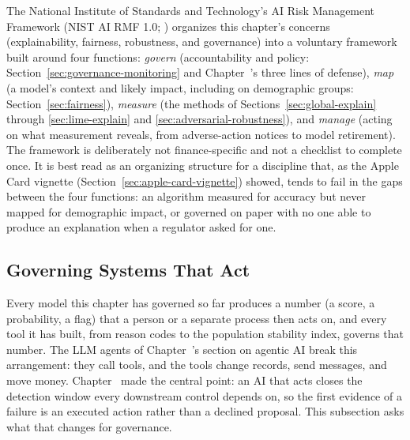 \documentclass[../ai_in_finance]{subfiles}
\begin{document}
The National Institute of Standards and Technology's AI Risk Management Framework (NIST AI RMF 1.0; \cite{nist2023artificial}) organizes this chapter's concerns (explainability, fairness, robustness, and governance) into a voluntary framework built around four functions: \emph{govern} (accountability and policy: Section~\ref{sec:governance-monitoring} and Chapter~'s three lines of defense), \emph{map} (a model's context and likely impact, including on demographic groups: Section~\ref{sec:fairness}), \emph{measure} (the methods of Sections~\ref{sec:global-explain} through \ref{sec:lime-explain} and \ref{sec:adversarial-robustness}), and \emph{manage} (acting on what measurement reveals, from adverse-action notices to model retirement). The framework is deliberately not finance-specific and not a checklist to complete once. It is best read as an organizing structure for a discipline that, as the Apple Card vignette (Section~\ref{sec:apple-card-vignette}) showed, tends to fail in the gaps between the four functions: an algorithm measured for accuracy but never mapped for demographic impact, or governed on paper with no one able to produce an explanation when a regulator asked for one.

\subsection{Governing Systems That Act}
\label{sec:governing-agents}

Every model this chapter has governed so far produces a number (a score, a probability, a flag) that a person or a separate process then acts on, and every tool it has built, from reason codes to the population stability index, governs that number. The LLM agents of Chapter~'s section on agentic AI break this arrangement: they call tools, and the tools change records, send messages, and move money. Chapter~ made the central point: an AI that acts closes the detection window every downstream control depends on, so the first evidence of a failure is an executed action rather than a declined proposal. This subsection asks what that changes for governance.
\end{document}
